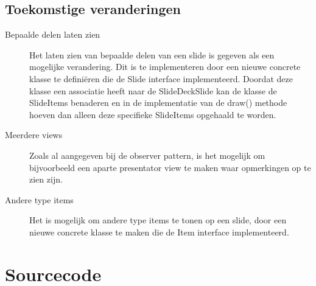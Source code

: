 \documentclass[a4paper]{article}
\begin{document}
\subsection{Toekomstige veranderingen}
\begin{description}
\item[Bepaalde delen laten zien] Het laten zien van bepaalde delen van een slide is gegeven als een mogelijke verandering. Dit is te implementeren door een nieuwe concrete klasse te definiëren die de Slide interface implementeerd. Doordat deze klasse een associatie heeft naar de SlideDeckSlide kan de klasse de SlideItems benaderen en in de implementatie van de draw() methode hoeven dan alleen deze specifieke SlideItems opgehaald te worden.
\item[Meerdere views] Zoals al aangegeven bij de observer pattern, is het mogelijk om bijvoorbeeld een aparte presentator view te maken waar opmerkingen op te zien zijn.
\item[Andere type items] Het is mogelijk om andere type items te tonen op een slide, door een nieuwe concrete klasse te maken die de Item interface implementeerd.
\end{description}


\section{Sourcecode}
\end{document}
